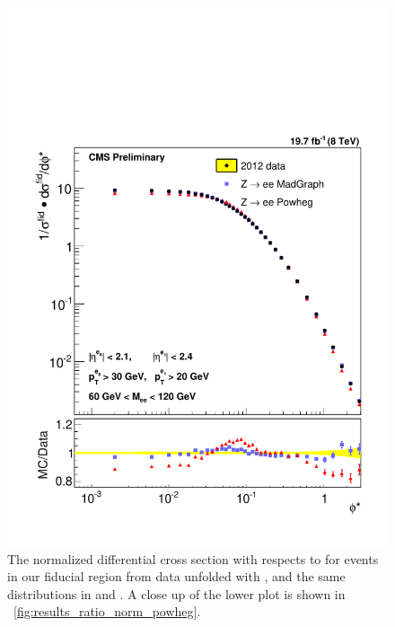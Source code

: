 \begin{figure}[!p]
    \centering
    \includegraphics[width=\textwidth]{figures/ZShape_elec_PH_Norm_Dressed.pdf}
    \caption[
        The normalized differential cross section with respects to \phistar for
        \Ztoee events in our fiducial region from data unfolded with \POWHEG,
        and the same distributions in \MADGRAPH and \POWHEG.
    ]{
        The normalized differential cross section with respects to \phistar for
        \Ztoee events in our fiducial region from data unfolded with \POWHEG,
        and the same distributions in \MADGRAPH and \POWHEG. A close up of the
        lower plot is shown in \FIG~\ref{fig:results_ratio_norm_powheg}.
    }
    \label{fig:results_norm_powheg}
\end{figure}

